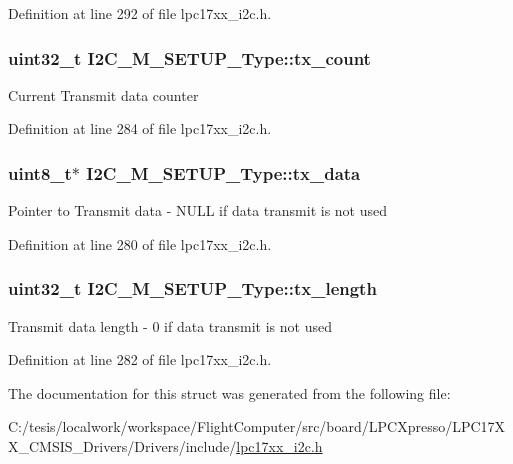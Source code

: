 \-Definition at line 292 of file lpc17xx\-\_\-i2c.\-h.

\hypertarget{struct_i2_c___m___s_e_t_u_p___type_a16c03240bb80a96c6568b3cbf740be94}{
\subsubsection[{tx\-\_\-count}]{\setlength{\rightskip}{0pt plus 5cm}uint32\-\_\-t {\bf \-I2\-C\-\_\-\-M\-\_\-\-S\-E\-T\-U\-P\-\_\-\-Type\-::tx\-\_\-count}}}\label{struct_i2_c___m___s_e_t_u_p___type_a16c03240bb80a96c6568b3cbf740be94}
\-Current \-Transmit data counter 

\-Definition at line 284 of file lpc17xx\-\_\-i2c.\-h.

\hypertarget{struct_i2_c___m___s_e_t_u_p___type_a17bf43e1146272e6a06df8f5adda2e72}{
\subsubsection[{tx\-\_\-data}]{\setlength{\rightskip}{0pt plus 5cm}uint8\-\_\-t$\ast$ {\bf \-I2\-C\-\_\-\-M\-\_\-\-S\-E\-T\-U\-P\-\_\-\-Type\-::tx\-\_\-data}}}\label{struct_i2_c___m___s_e_t_u_p___type_a17bf43e1146272e6a06df8f5adda2e72}
\-Pointer to \-Transmit data -\/ \-N\-U\-L\-L if data transmit is not used 

\-Definition at line 280 of file lpc17xx\-\_\-i2c.\-h.

\hypertarget{struct_i2_c___m___s_e_t_u_p___type_af9632e0a6ac1ee550ec274c50e45af86}{
\subsubsection[{tx\-\_\-length}]{\setlength{\rightskip}{0pt plus 5cm}uint32\-\_\-t {\bf \-I2\-C\-\_\-\-M\-\_\-\-S\-E\-T\-U\-P\-\_\-\-Type\-::tx\-\_\-length}}}\label{struct_i2_c___m___s_e_t_u_p___type_af9632e0a6ac1ee550ec274c50e45af86}
\-Transmit data length -\/ 0 if data transmit is not used 

\-Definition at line 282 of file lpc17xx\-\_\-i2c.\-h.



\-The documentation for this struct was generated from the following file\-:\begin{DoxyCompactItemize}
\item 
\-C\-:/tesis/localwork/workspace/\-Flight\-Computer/src/board/\-L\-P\-C\-Xpresso/\-L\-P\-C17\-X\-X\-\_\-\-C\-M\-S\-I\-S\-\_\-\-Drivers/\-Drivers/include/\hyperlink{lpc17xx__i2c_8h}{lpc17xx\-\_\-i2c.\-h}\end{DoxyCompactItemize}
